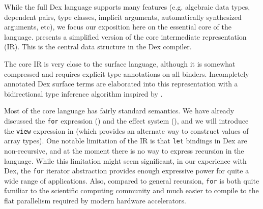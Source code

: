 \documentclass[acmsmall,screen,nonacm]{acmart}
\newcommand{\ttt}[1]{\texttt{#1}}
\newcommand{\tsc}[1]{\textsc{#1}}
\begin{document}
While the full Dex language supports many features (e.g. algebraic data types, dependent pairs, type classes, implicit arguments, automatically synthesized arguments, etc), we focus our exposition here on the essential core of the language.
 presents a simplified version of the core intermediate representation (IR).
This is the central data structure in the Dex compiler.

The core IR is very close to the surface language, although it is somewhat compressed and requires explicit type annotations on all binders.
Incompletely annotated Dex surface terms are elaborated into this representation with a bidirectional type inference algorithm inspired by \citet{peytonjones2007practical}.

Most of the core language has fairly standard semantics. We have already discussed the \ttt{for} expression () and the effect system (), and we will introduce the \ttt{view} expression in  (which provides an alternate way to construct values of array types).
%
One notable limitation of the IR is that \texttt{let} bindings in Dex are non-recursive, and at the moment there is no way to express recursion in the language.
While this limitation might seem significant, in our experience with Dex, the \texttt{for} iterator abstraction provides enough expressive power for quite a wide range of applications.
Also, compared to general recursion, \texttt{for} is both quite familiar to the scientific computing community and much easier to compile to the flat parallelism required by modern hardware accelerators.
\end{document}
